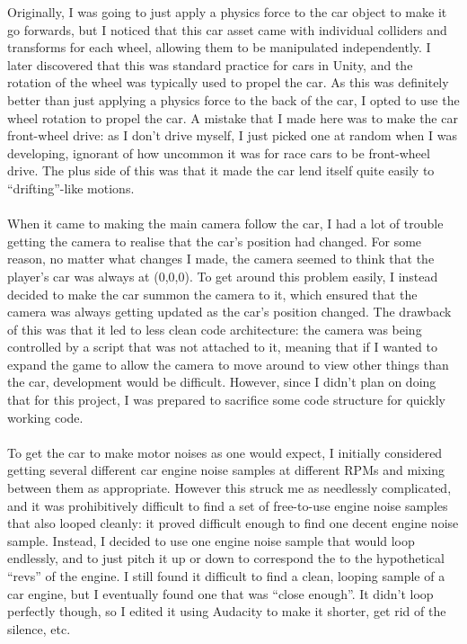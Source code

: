 \documentclass[a4paper,11pt]{article}
\begin{document}
Originally, I was going to just apply a physics force to the car object to make it go forwards, but I noticed 
that this car asset came with individual colliders and transforms for each wheel, allowing them to be manipulated 
independently.
I later discovered that this was standard practice for cars in Unity, and the rotation of the wheel was 
typically used to propel the car. 
As this was definitely better than just applying a physics force to the back of the car, I opted to use the 
wheel rotation to propel the car.
A mistake that I made here was to make the car front-wheel drive: as I don't drive myself, I just picked one 
at random when I was developing, ignorant of how uncommon it was for race cars to be front-wheel drive. 
The plus side of this was that it made the car lend itself quite easily to ``drifting''-like motions.
\\\\
When it came to making the main camera follow the car, I had a lot of trouble getting the camera to realise that 
the car's position had changed. 
For some reason, no matter what changes I made, the camera seemed to think that the player's car was always at 
(0,0,0).
To get around this problem easily, I instead decided to make the car summon the camera to it, which ensured that 
the camera was always getting updated as the car's position changed.
The drawback of this was that it led to less clean code architecture: the camera was being controlled by a script 
that was not attached to it, meaning that if I wanted to expand the game to allow the camera to move around to 
view other things than the car, development would be difficult.
However, since I didn't plan on doing that for this project, I was prepared to sacrifice some code structure for 
quickly working code.
\\\\
To get the car to make motor noises as one would expect, I initially considered getting several different car engine 
noise samples at different RPMs and mixing between them as appropriate. 
However this struck me as needlessly complicated, and it was prohibitively difficult to find a set of free-to-use
engine noise samples that also looped cleanly: it proved difficult enough to find one decent engine noise sample.
Instead, I decided to use one engine noise sample that would loop endlessly, and to just pitch it up or down 
to correspond the to the hypothetical ``revs'' of the engine.
I still found it difficult to find a clean, looping sample of a car engine, but I eventually found one that was
``close enough''.
It didn't loop perfectly though, so I edited it using Audacity to make it shorter, get rid of the silence, etc.
\end{document}
